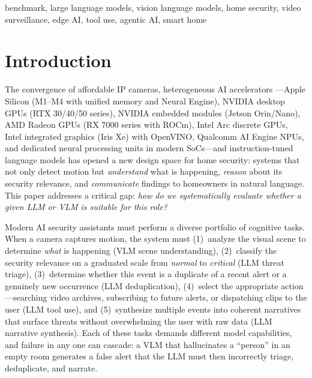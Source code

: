 \documentclass[conference]{IEEEtran}
\begin{document}
\begin{IEEEkeywords}
benchmark, large language models, vision language models, home security,
video surveillance, edge AI, tool use, agentic AI, smart home
\end{IEEEkeywords}


\section{Introduction}

The convergence of affordable IP cameras, heterogeneous AI accelerators
---Apple Silicon (M1--M4 with unified memory and Neural Engine), NVIDIA
desktop GPUs (RTX 30/40/50 series), NVIDIA embedded modules (Jetson
Orin/Nano), AMD Radeon GPUs (RX 7000 series with ROCm), Intel Arc
discrete GPUs, Intel integrated graphics (Iris Xe) with OpenVINO,
Qualcomm AI Engine NPUs, and dedicated neural processing units in
modern SoCs---and instruction-tuned language models
has opened a new design space for home security: systems that not only
detect motion but \emph{understand} what is happening, \emph{reason}
about its security relevance, and \emph{communicate} findings to
homeowners in natural language. This paper addresses a critical gap:
\emph{how do we systematically evaluate whether a given LLM or VLM is
suitable for this role?}

Modern AI security assistants must perform a diverse portfolio of
cognitive tasks. When a camera captures motion, the system must
(1)~analyze the visual scene to determine \emph{what} is happening
(VLM scene understanding), (2)~classify the security relevance on a
graduated scale from \emph{normal} to \emph{critical} (LLM threat
triage), (3)~determine whether this event is a duplicate of a recent
alert or a genuinely new occurrence (LLM deduplication),
(4)~select the appropriate action---searching video archives,
subscribing to future alerts, or dispatching clips to the user (LLM
tool use), and (5)~synthesize multiple events into coherent narratives
that surface threats without overwhelming the user with raw data
(LLM narrative synthesis). Each of these tasks demands different model
capabilities, and failure in any one can cascade: a VLM that hallucinates
a ``person'' in an empty room generates a false alert that the LLM must
then incorrectly triage, deduplicate, and narrate.
\end{document}
